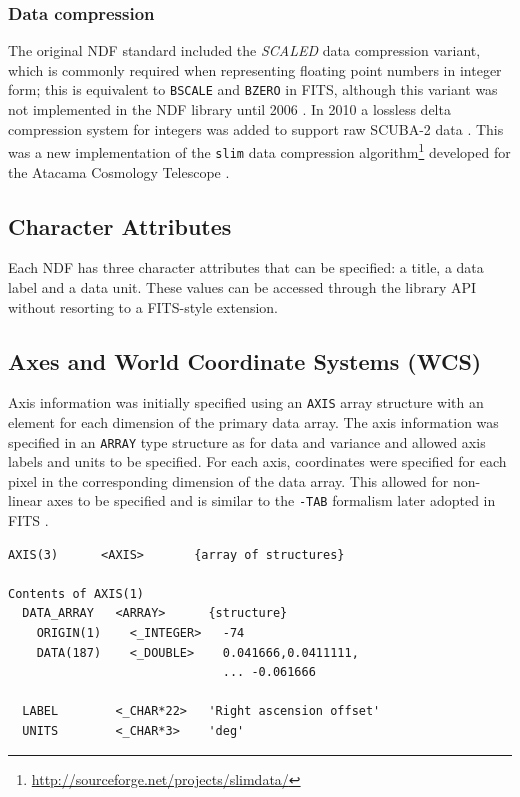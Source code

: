 \documentclass[final,authoryear,5p,times,twocolumn]{elsarticle}
\begin{document}
\subsubsection{Data compression}

The original NDF standard included the \emph{SCALED} data compression
variant, which is commonly required when representing floating point numbers in
integer form; this is equivalent to \texttt{BSCALE} and \texttt{BZERO} in
FITS, although this variant was not implemented in the NDF library
until 2006 \citep{2008ASPC..394..650C}. In 2010 a lossless delta
compression system for integers was added to support raw SCUBA-2 data
\citep{2013MNRAS.430.2513H}. This was a new implementation of the
\texttt{slim} data compression
algorithm\footnote{\url{http://sourceforge.net/projects/slimdata/}}
developed for the Atacama Cosmology Telescope
\citep{2004SPIE.5498....1F}.

\subsection{Character Attributes}

Each NDF has three character attributes that can be specified: a
title, a data label and a data unit. These values can be accessed
through the library API without resorting to a FITS-style extension.

\subsection{Axes and World Coordinate Systems (WCS)}

Axis information was initially specified using an \texttt{AXIS} array
structure with an element for each dimension of the primary data
array. The axis information was specified in an \texttt{ARRAY} type
structure as for data and variance and allowed axis labels and units
to be specified. For each axis, coordinates were specified for each
pixel in the corresponding dimension of the data array. This allowed
for non-linear axes to be specified and is similar to the
\texttt{-TAB} formalism later adopted in FITS \citep{2006A&A...446..747G}.

{\small
\begin{verbatim}
AXIS(3)      <AXIS>       {array of structures}

Contents of AXIS(1)
  DATA_ARRAY   <ARRAY>      {structure}
    ORIGIN(1)    <_INTEGER>   -74
    DATA(187)    <_DOUBLE>    0.041666,0.0411111,
                              ... -0.061666

  LABEL        <_CHAR*22>   'Right ascension offset'
  UNITS        <_CHAR*3>    'deg'
\end{verbatim}
}
\end{document}
